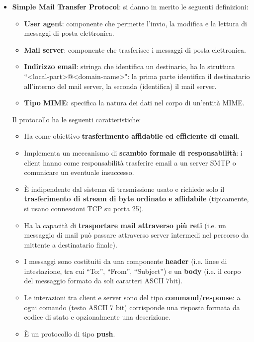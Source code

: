 \documentclass[11pt, italian, openany]{book}
\begin{document}
\begin{sloppypar}
\begin{itemize}[topsep=0pt]
	Il terminale in esecuzione sia sul client sia sul server \`e un ``Network Virtual Terminal": gli host traducono le loro caratteristiche locali cos\`i da
	apparire esternamente come un NVT e assumono che l’host remoto sia un NVT; si scambiano dati e comandi in formato 7-bit US-ASCII sullo stesso canale (prevede
	dunque ``in-band signaling"), ogni carattere \`e inviato come un ottetto con il primo bit settato a 0 se si tratta di un dato, a 1 per i comandi.

	\item \textbf{Simple Mail Transfer Protocol}: si danno in merito le seguenti definizioni:
	\vspace{-3.5mm}
	\begin{itemize}
		\itemsep-0.3em
		\item \textbf{User agent}: componente che permette l'invio, la modifica e la lettura di messaggi di posta elettronica.
		\item \textbf{Mail server}: componente che trasferisce i messaggi di posta elettronica.
		\item \textbf{Indirizzo email}: stringa che identifica un destinario, ha la struttura
		``\textless{local-part}\textgreater{@}\textless{domain-name}\textgreater{"}:
		la prima parte identifica il destinatario all'interno del mail server, la seconda (identifica) il mail server.
		\item \textbf{Tipo MIME}: specifica la natura dei dati nel corpo di un'entità MIME.
	\end{itemize}

	Il protocollo ha le seguenti caratteristiche:
	\vspace{-3.5mm}
	\begin{itemize}
		\itemsep-0.3em
		\item Ha come obiettivo \textbf{trasferimento affidabile ed efficiente di email}.
		\item Implementa un meccanismo di \textbf{scambio formale di responsabilit\`a}: i client hanno come responsabilit\`a trasferire email a un server SMTP o
		comunicare un eventuale insuccesso.
		\item \`E indipendente dal sistema di trasmissione usato e richiede solo il \textbf{trasferimento di stream di byte ordinato e affidabile} (tipicamente,
		si usano connessioni TCP su porta 25).
		\item Ha la capacit\`a di \textbf{trasportare mail attraverso pi\`u reti} (i.e. un messaggio di mail può passare attraverso server intermedi nel percorso da
		mittente a destinatario finale).
		\item I messaggi sono costituiti da una componente \textbf{header} (i.e. linee di intestazione, tra cui ``To:'', ``From'', ``Subject'') e un \textbf{body}
		(i.e. il corpo del messaggio formato da soli caratteri ASCII 7bit).
		\item Le interazioni tra client e server sono del tipo \textbf{command}/\textbf{response}: a ogni comando (testo ASCII 7 bit) corrisponde una risposta
		formata da codice di stato e opzionalmente una descrizione.
		\item \`E un protocollo di tipo \textbf{push}.
	\end{itemize}


\end{itemize}
\end{sloppypar}
\end{document}

